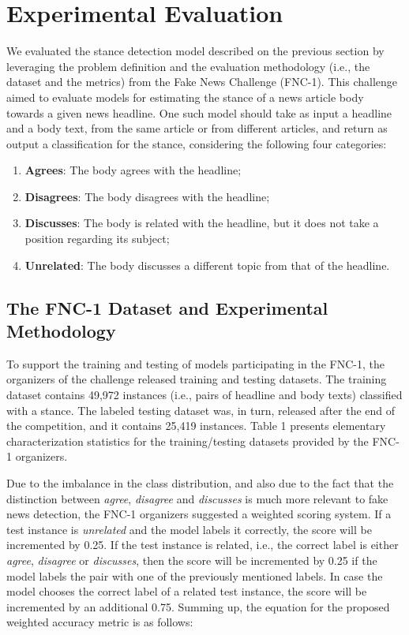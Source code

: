 \section{Experimental Evaluation}

We evaluated the stance detection model described on the previous section by leveraging the problem definition and the evaluation methodology (i.e., the dataset and the metrics) from the Fake News Challenge (FNC-1). This challenge aimed to evaluate models for estimating the stance of a news article body towards a given news headline. One such model should take as input a headline and a body text, from the same article or from different articles, and return as output a classification for the stance, considering the following four categories:
\begin{enumerate}
\item \textbf{Agrees}: The body agrees with the headline;
\item \textbf{Disagrees}: The body disagrees with the headline;
\item \textbf{Discusses}: The body is related with the headline, but it does not take a position regarding its subject;
\item \textbf{Unrelated}: The body discusses a different topic from that of the headline.
\end{enumerate}

\subsection{The FNC-1 Dataset and Experimental Methodology}

To support the training and testing of models participating in the FNC-1, the organizers of the challenge released training and testing datasets. The training dataset contains 49,972 instances (i.e., pairs of headline and body texts) classified with a stance. The labeled testing dataset was, in turn, released after the end of the competition, and it contains 25,419 instances. Table 1 presents elementary characterization statistics for the training/testing datasets provided by the FNC-1 organizers.


Due to the imbalance in the class distribution, and also due to the fact that the distinction between \textit{agree}, \textit{disagree} and \textit{discusses} is much more relevant to fake news detection, the FNC-1 organizers suggested a weighted scoring system. If a test instance is \textit{unrelated} and the model labels it correctly, the score will be incremented by 0.25. If the test instance is related, i.e., the correct label is either \textit{agree}, \textit{disagree} or \textit{discusses}, then the score will be incremented by 0.25 if the model labels the pair with one of the previously mentioned labels. In case the model chooses the correct label of a related test instance, the score will be incremented by an additional 0.75. Summing up, the equation for the proposed weighted accuracy metric is as follows:


